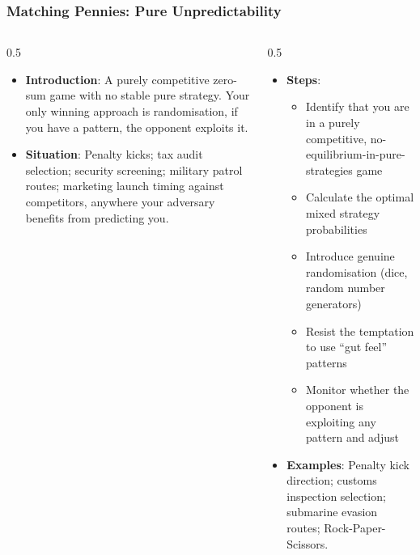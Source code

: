 \begin{frame}[fragile]\frametitle{Matching Pennies: Pure Unpredictability}
\begin{columns}
    \begin{column}[T]{0.5\linewidth}
      \begin{itemize}
        \item \textbf{Introduction}: A purely competitive zero-sum game with no stable pure strategy. Your only winning approach is randomisation, if you have a pattern, the opponent exploits it.
        \item \textbf{Situation}: Penalty kicks; tax audit selection; security screening; military patrol routes; marketing launch timing against competitors, anywhere your adversary benefits from predicting you.
      \end{itemize}
    \end{column}
    \begin{column}[T]{0.5\linewidth}
      \begin{itemize}
        \item \textbf{Steps}:
        \begin{itemize}
          \item Identify that you are in a purely competitive, no-equilibrium-in-pure-strategies game
          \item Calculate the optimal mixed strategy probabilities
          \item Introduce genuine randomisation (dice, random number generators)
          \item Resist the temptation to use ``gut feel'' patterns
          \item Monitor whether the opponent is exploiting any pattern and adjust
        \end{itemize}\item \textbf{Examples}: Penalty kick direction; customs inspection selection; submarine evasion routes; Rock-Paper-Scissors.
      \end{itemize}
    \end{column}
  \end{columns}
\end{frame}


